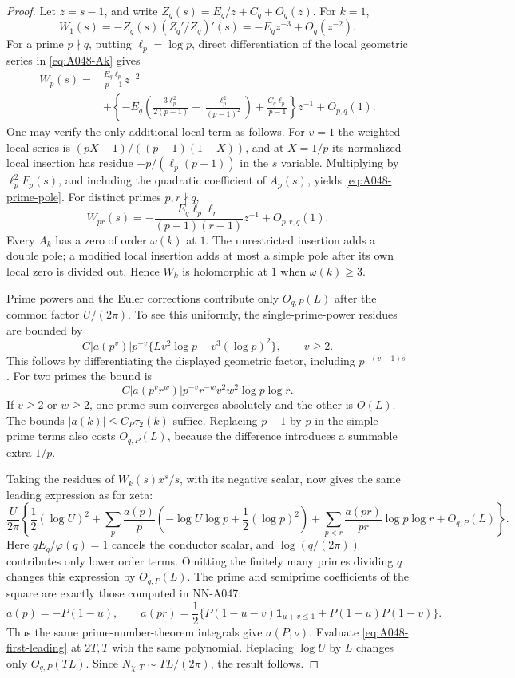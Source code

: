 \begin{proof}
Let \(z=s-1\), and write
\(Z_q(s)=E_q/z+C_q+O_q(z)\).
For \(k=1\),
\[
 W_1(s)=-Z_q(s)(Z_q'/Z_q)'(s)
             =-E_qz^{-3}+O_q(z^{-2}).
\]
For a prime \(p\nmid q\), putting \(\ell_p=\log p\),
direct differentiation of the local geometric series
in \eqref{eq:A048-Ak} gives
\begin{align}
 W_p(s)={}&
 \frac{E_q\ell_p}{p-1}z^{-2}\nonumber\\
 &+\left\{-E_q\left(
       \frac{3\ell_p^2}{2(p-1)}
            +\frac{\ell_p^2}{(p-1)^2}\right)
       +\frac{C_q\ell_p}{p-1}\right\}z^{-1}
       +O_{p,q}(1).
 \label{eq:A048-prime-pole}
\end{align}
One may verify the only additional local term as follows.
For \(v=1\) the weighted local series is
\((pX-1)/((p-1)(1-X))\), and at \(X=1/p\)
its normalized local insertion has residue
\(-p/(\ell_p(p-1))\) in the \(s\) variable.
Multiplying by \(\ell_p^2F_p(s)\), and including
the quadratic coefficient of \(A_p(s)\), yields
\eqref{eq:A048-prime-pole}.
For distinct primes \(p,r\nmid q\),
\[
 W_{pr}(s)=
 -\frac{E_q\ell_p\ell_r}{(p-1)(r-1)}z^{-1}+O_{p,r,q}(1).
\]
Every \(A_k\) has a zero of order \(\omega(k)\)
at \(1\). The unrestricted insertion adds a double
pole; a modified local insertion adds at most a
simple pole after its own local zero is divided out.
Hence \(W_k\) is holomorphic at \(1\) when
\(\omega(k)\ge3\).

Prime powers and the Euler corrections contribute
only \(O_{q,P}(L)\) after the common factor \(U/(2\pi)\).
To see this uniformly, the single-prime-power residues
are bounded by
\[
 C|a(p^v)|p^{-v}
             \{Lv^2\log p+v^3(\log p)^2\},
                    \qquad v\ge2.
\]
This follows by differentiating the displayed geometric
factor, including \(p^{-(v-1)s}\).
For two primes the bound is
\[
 C|a(p^vr^w)|p^{-v}r^{-w}
                    v^2w^2\log p\log r.
\]
If \(v\ge2\) or \(w\ge2\), one prime sum converges
absolutely and the other is \(O(L)\).
The bounds \(|a(k)|\le C_P\tau_2(k)\) suffice.
Replacing \(p-1\) by \(p\) in the simple-prime terms
also costs \(O_{q,P}(L)\), because the difference
introduces a summable extra \(1/p\).

Taking the residues of \(W_k(s)x^s/s\), with its
negative scalar, now gives the same leading expression
as for zeta:
\[
 \frac U{2\pi}\left\{\frac12(\log U)^2+
 \sum_p\frac{a(p)}p
       \left(-\log U\log p+\frac12(\log p)^2\right)
 +\sum_{p<r}\frac{a(pr)}{pr}\log p\log r
 +O_{q,P}(L)\right\}.
 \tag{A048.15}\label{eq:A048-first-leading}
\]
Here \(qE_q/\varphi(q)=1\) cancels the conductor
scalar, and \(\log(q/(2\pi))\) contributes only lower
order terms. Omitting the finitely many primes
dividing \(q\) changes this expression by \(O_{q,P}(L)\).
The prime and semiprime coefficients of the square
are exactly those computed in NN-A047:
\[
 a(p)=-P(1-u),\qquad
 a(pr)=\frac12\{P(1-u-v)\mathbf1_{u+v\le1}
                              +P(1-u)P(1-v)\}.
\]
Thus the same prime-number-theorem integrals give
\(a(P,\nu)\). Evaluate \eqref{eq:A048-first-leading}
at \(2T,T\) with the same polynomial. Replacing
\(\log U\) by \(L\) changes only \(O_{q,P}(TL)\).
Since \(N_{\chi,T}\sim TL/(2\pi)\), the result follows.
\end{proof}

